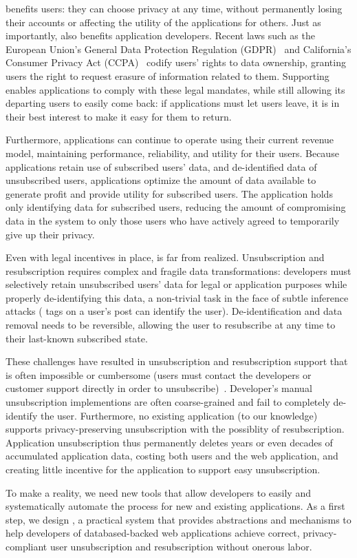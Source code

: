 \sys benefits users: they can choose privacy at any time, without
permanently losing their accounts or affecting the utility of the applications for others.  Just as
importantly, \sys also benefits application developers. Recent laws such as the
European Union's General Data Protection Regulation (GDPR)~\cite{eu:gdpr} and California's Consumer
Privacy Act (CCPA)~\cite{ca:privacy-act} codify users' rights to data ownership, granting users the
right to request erasure of information related to them. Supporting \sys enables
applications to comply with these legal mandates, while still allowing its departing users to easily
come back: if applications must let users leave, it is in their best interest to make it easy for
them to return.  

Furthermore, applications can continue to operate using their current revenue model, maintaining
performance, reliability, and utility for their users.  Because applications retain use of
subscribed users' data, and de-identified data of unsubscribed users, applications optimize the
amount of data available to generate profit and provide utility for subscribed users. The
application holds only identifying data for subscribed users, reducing the amount of
compromising data in the system to only those users who have actively agreed to temporarily give up
their privacy.

Even with legal incentives in place, \sys is far from realized.
Unsubscription and resubscription requires complex and fragile data transformations: 
developers must selectively retain unsubscribed users' data for legal or application purposes while
properly de-identifying this data, a non-trivial task in the face of subtle inference attacks (\eg
tags on a user's post can identify the user). De-identification and data removal needs to be
reversible, allowing the user to resubscribe at any time to their last-known subscribed state.

These challenges have resulted in unsubscription and resubscription support that is often impossible
or cumbersome (users must contact the developers or customer support directly in order to
unsubscribe)~\cite{jdm}.  Developer's manual unsubscription implementions are often coarse-grained
and fail to completely de-identify the user. Furthermore, no existing application (to our knowledge)
supports privacy-preserving unsubscription with the possiblity of resubscription. Application
unsubscription thus permanently deletes years or even decades of accumulated application data,
costing both users and the web application, and creating little incentive for the application to
support easy unsubscription. 

To make \sys a reality, we need new tools that allow developers to easily and
systematically automate the process for new and existing applications. As a first step, we design 
\proto, a practical system that provides abstractions and mechanisms to help developers of databased-backed web
applications achieve correct, privacy-compliant user unsubscription and resubscription without
onerous labor.
